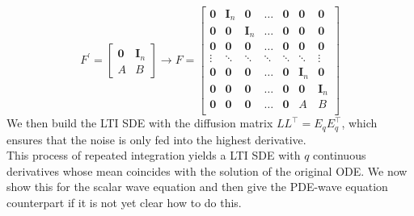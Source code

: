 $$F^\prime\!\! =\! \begin{bmatrix}
    \mathbf{0} & \textbf{I}_n \\ \!A & \!B
    \end{bmatrix} \to F = \begin{bmatrix}
\mathbf{0} & \textbf{I}_n & \mathbf{0} & \!\!\!\dots\!\! & \mathbf{0} & \mathbf{0} & \!\!\mathbf{0} \\
\mathbf{0} & \mathbf{0} & \textbf{I}_n & \!\!\!\dots\!\! & \mathbf{0} & \mathbf{0} & \!\!\mathbf{0} \\
\mathbf{0} & \mathbf{0} & \mathbf{0} & \!\!\!\dots\!\! & \mathbf{0} & \mathbf{0} & \!\!\mathbf{0} \\
\vdots & \!\!\ddots\!\! & \!\!\ddots\!\! & \!\!\ddots\!\! & \!\!\ddots\!\! & \!\!\ddots\!\! & \!\!\vdots \\
\mathbf{0} & \mathbf{0} & \mathbf{0} & \!\!\!\dots\!\! & \mathbf{0} & \textbf{I}_n & \!\!\mathbf{0} \\
\mathbf{0} & \mathbf{0} & \mathbf{0} & \!\!\!\dots\!\! & \mathbf{0} & \mathbf{0} & \textbf{I}_n \\
\mathbf{0} & \mathbf{0} & \mathbf{0} & \!\!\!\dots\!\! & \mathbf{0} & \!\!A & \!\!\!\!B \\
\end{bmatrix}$$
We then build the LTI SDE with the diffusion matrix $LL^\top = E_qE_q^\top$, which ensures that the noise is only fed into the highest derivative. \\
This process of repeated integration yields a LTI SDE with $q$ continuous derivatives whose mean coincides with the solution of the original ODE. We now show this for the scalar wave equation and then give the PDE-wave equation counterpart if it is not yet clear how to do this.

